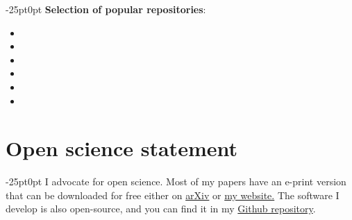 \documentclass[line]{res}
\newenvironment{p11}
{\begin{adjustwidth}{-25pt}{0pt}
\vspace{8pt}}
{\end{adjustwidth}}
\begin{document}
\begin{resume}
\begin{p11}
\vspace{4pt}
\textbf{Selection of popular repositories}:
\begin{itemize}
	\item {}
	\item {}
	\item {}
	\item {}
	\item {}
	\item {}
\end{itemize}
\end{p11}

\section{Open science statement}
\begin{p11}\setlength{\parskip}{3pt}
I advocate for open science.
Most of my papers have an e-print version that can be downloaded for free either on \href{https://arxiv.org/search/physics?searchtype=author&query=Font%2C+B}{arXiv} or \href{https://b-fg.github.io/_pages/publications.html}{my website.}
The software I develop is also open-source, and you can find it in my \href{https://github.com/b-fg}{Github repository}.
\end{p11}

\end{resume}
\end{document}
